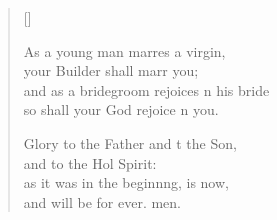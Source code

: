 \begin{verse}[\versewidth]
\begin{patverse}
As a young man marr\pointup{\i}es a virgin,\Med\\
your Builder shall marr you;\\
and as a bridegroom rejoices \pointup{\i}n his bride\Med\\
so shall your God rejoice \pointup{\i}n you.

Glory to the Father and t the Son,\Med\\
    and to the Hol Spirit:\\
as it was in the beginn\pointup{\i}ng, is now,\Med\\
    and will be for ever. men.
  \end{patverse}
\end{verse}
